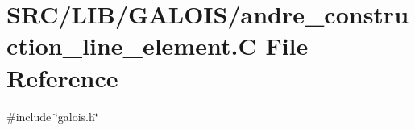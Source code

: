 \hypertarget{andre__construction__line__element_8_c}{}\section{S\+R\+C/\+L\+I\+B/\+G\+A\+L\+O\+I\+S/andre\+\_\+construction\+\_\+line\+\_\+element.C File Reference}
\label{andre__construction__line__element_8_c}
{\ttfamily \#include \char`\"{}galois.\+h\char`\"{}}\newline
